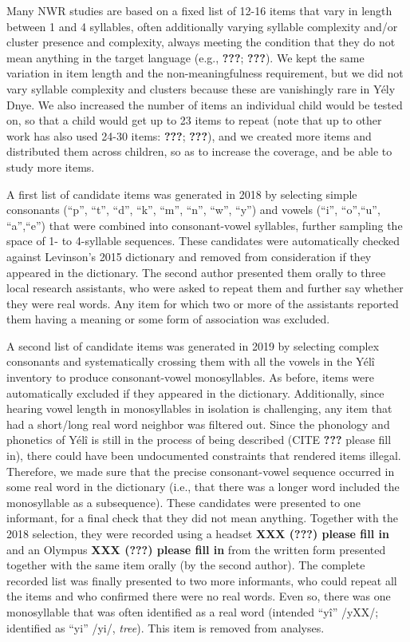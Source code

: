 \documentclass[english,,man,floatsintext]{apa6}
\begin{document}
Many NWR studies are based on a fixed list of 12-16 items that vary in length between 1 and 4 syllables, often additionally varying syllable complexity and/or cluster presence and complexity, always meeting the condition that they do not mean anything in the target language (e.g., {\textbf{???}}; {\textbf{???}}). We kept the same variation in item length and the non-meaningfulness requirement, but we did not vary syllable complexity and clusters because these are vanishingly rare in Yély Dnye. We also increased the number of items an individual child would be tested on, so that a child would get up to 23 items to repeat (note that up to other work has also used 24-30 items: {\textbf{???}}; {\textbf{???}}), and we created more items and distributed them across children, so as to increase the coverage, and be able to study more items.

A first list of candidate items was generated in 2018 by selecting simple consonants (\enquote{p}, \enquote{t}, \enquote{d}, \enquote{k}, \enquote{m}, \enquote{n}, \enquote{w}, \enquote{y}) and vowels (\enquote{i}, \enquote{o},\enquote{u}, \enquote{a},\enquote{e}) that were combined into consonant-vowel syllables, further sampling the space of 1- to 4-syllable sequences. These candidates were automatically checked against Levinson's 2015 dictionary and removed from consideration if they appeared in the dictionary. The second author presented them orally to three local research assistants, who were asked to repeat them and further say whether they were real words. Any item for which two or more of the assistants reported them having a meaning or some form of association was excluded.

A second list of candidate items was generated in 2019 by selecting complex consonants and systematically crossing them with all the vowels in the Yélî inventory to produce consonant-vowel monosyllables. As before, items were automatically excluded if they appeared in the dictionary. Additionally, since hearing vowel length in monosyllables in isolation is challenging, any item that had a short/long real word neighbor was filtered out. Since the phonology and phonetics of Yélî is still in the process of being described (CITE {\textbf{???}} please fill in), there could have been undocumented constraints that rendered items illegal. Therefore, we made sure that the precise consonant-vowel sequence occurred in some real word in the dictionary (i.e., that there was a longer word included the monosyllable as a subsequence). These candidates were presented to one informant, for a final check that they did not mean anything. Together with the 2018 selection, they were recorded using a headset \textbf{XXX ({\textbf{???}}) please fill in} and an Olympus \textbf{XXX ({\textbf{???}}) please fill in} from the written form presented together with the same item orally (by the second author). The complete recorded list was finally presented to two more informants, who could repeat all the items and who confirmed there were no real words. Even so, there was one monosyllable that was often identified as a real word (intended \enquote{yî} /yXX/; identified as \enquote{yi} /yi/, \emph{tree}). This item is removed from analyses.
\end{document}
